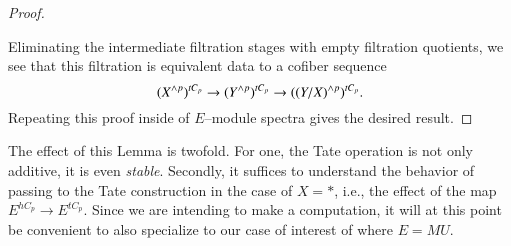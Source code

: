 \begin{proof}
\begin{center}
\end{center}
Eliminating the intermediate filtration stages with empty filtration quotients, we see that this filtration is equivalent data to a cofiber sequence \[(X^{\wedge p})^{tC_p} \to (Y^{\wedge p})^{tC_p} \to ((Y/X)^{\wedge p})^{tC_p}.\]  Repeating this proof inside of $E$--module spectra gives the desired result.
\end{proof}

The effect of this Lemma is twofold.  For one, the Tate operation is not only additive, it is even \emph{stable}.  Secondly, it suffices to understand the behavior of passing to the Tate construction in the case of $X = *$, i.e., the effect of the map $E^{hC_p} \to E^{tC_p}$.  Since we are intending to make a computation, it will at this point be convenient to also specialize to our case of interest of where $E = MU$.

